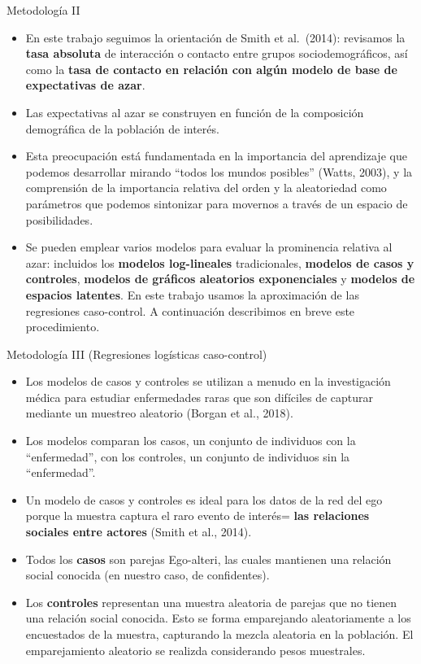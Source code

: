 \documentclass[
  8pt,
  ignorenonframetext,
]{beamer}
\begin{document}
\begin{frame}{Metodología II}
\protect\hypertarget{metodologuxeda-ii}{}
\begin{itemize}
\item
  En este trabajo seguimos la orientación de Smith et al.~(2014):
  revisamos la \textbf{tasa absoluta} de interacción o contacto entre
  grupos sociodemográficos, así como la \textbf{tasa de contacto en
  relación con algún modelo de base de expectativas de azar}.
\item
  Las expectativas al azar se construyen en función de la composición
  demográfica de la población de interés.
\item
  Esta preocupación está fundamentada en la importancia del aprendizaje
  que podemos desarrollar mirando ``todos los mundos posibles'' (Watts,
  2003), y la comprensión de la importancia relativa del orden y la
  aleatoriedad como parámetros que podemos sintonizar para movernos a
  través de un espacio de posibilidades.
\item
  Se pueden emplear varios modelos para evaluar la prominencia relativa
  al azar: incluidos los \textbf{modelos log-lineales} tradicionales,
  \textbf{modelos de casos y controles}, \textbf{modelos de gráficos
  aleatorios exponenciales} y \textbf{modelos de espacios latentes}. En
  este trabajo usamos la aproximación de las regresiones caso-control. A
  continuación describimos en breve este procedimiento.
\end{itemize}
\end{frame}

\begin{frame}{Metodología III (Regresiones logísticas caso-control)}
\protect\hypertarget{metodologuxeda-iii-regresiones-loguxedsticas-caso-control}{}
\begin{itemize}
\item
  Los modelos de casos y controles se utilizan a menudo en la
  investigación médica para estudiar enfermedades raras que son
  difíciles de capturar mediante un muestreo aleatorio (Borgan et al.,
  2018).
\item
  Los modelos comparan los casos, un conjunto de individuos con la
  ``enfermedad'', con los controles, un conjunto de individuos sin la
  ``enfermedad''.
\item
  Un modelo de casos y controles es ideal para los datos de la red del
  ego porque la muestra captura el raro evento de interés= \textbf{las
  relaciones sociales entre actores} (Smith et al., 2014).
\item
  Todos los \textbf{casos} son parejas Ego-alteri, las cuales mantienen
  una relación social conocida (en nuestro caso, de confidentes).
\item
  Los \textbf{controles} representan una muestra aleatoria de parejas
  que no tienen una relación social conocida. Esto se forma emparejando
  aleatoriamente a los encuestados de la muestra, capturando la mezcla
  aleatoria en la población. El emparejamiento aleatorio se realizda
  considerando pesos muestrales.
\end{itemize}
\end{frame}
\end{document}

